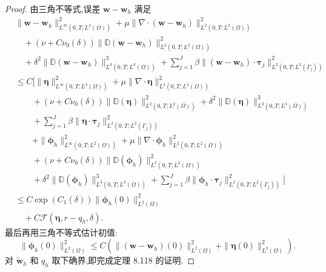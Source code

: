 \begin{theorem}[自然正则性下的一致有限元误差估计]
\begin{proof}
由三角不等式,误差 $\bm{w}-\bm{w}_h$ 满足
\[
\begin{aligned}
&\|\bm{w}-\bm{w}_h\|_{L^\infty(0,T;L^2(\Omega))}^2
 +\mu\|\nabla\cdot(\bm{w}-\bm{w}_h)\|_{L^2(0,T;L^2(\Omega))}^2\\
&\quad+(\nu+C\nu_0(\delta))
       \|\mathbb{D}(\bm{w}-\bm{w}_h)\|_{L^2(0,T;L^2(\Omega))}^2\\
&\quad+\delta^2\|\mathbb{D}(\bm{w}-\bm{w}_h)\|_{L^3(0,T;L^3(\Omega))}^3
 +\sum_{j=1}^J\beta
       \|(\bm{w}-\bm{w}_h)\cdot\symbf{\tau}_j\|
         _{L^2(0,T;L^2(\Gamma_j))}^2\\
&\le C\Biggl[\|\symbf{\eta}\|_{L^\infty(0,T;L^2(\Omega))}^2
 +\mu\|\nabla\cdot\symbf{\eta}\|_{L^2(0,T;L^2(\Omega))}^2\\
&\qquad+(\nu+C\nu_0(\delta))
       \|\mathbb{D}(\symbf{\eta})\|_{L^2(0,T;L^2(\Omega))}^2
 +\delta^2\|\mathbb{D}(\symbf{\eta})\|_{L^3(0,T;L^3(\Omega))}^3\\
&\qquad+\sum_{j=1}^J\beta
       \|\symbf{\eta}\cdot\symbf{\tau}_j\|_{L^2(0,T;L^2(\Gamma_j))}^2\\
&\qquad+\|\symbf{\phi}_h\|_{L^\infty(0,T;L^2(\Omega))}^2
 +\mu\|\nabla\cdot\symbf{\phi}_h\|_{L^2(0,T;L^2(\Omega))}^2\\
&\qquad+(\nu+C\nu_0(\delta))
       \|\mathbb{D}(\symbf{\phi}_h)\|_{L^2(0,T;L^2(\Omega))}^2\\
&\qquad+\delta^2\|\mathbb{D}(\symbf{\phi}_h)\|_{L^3(0,T;L^3(\Omega))}^3
 +\sum_{j=1}^J\beta
       \|\symbf{\phi}_h\cdot\symbf{\tau}_j\|_{L^2(0,T;L^2(\Gamma_j))}^2\Biggr]\\
&\le C\exp(C_1(\delta))
       \|\symbf{\phi}_h(0)\|_{L^2(\Omega)}^2\\
&\quad+C\mathcal{F}(\symbf{\eta},r-q_h,\delta).
\end{aligned}
\]
最后再用三角不等式估计初值:
\[
\|\symbf{\phi}_h(0)\|_{L^2(\Omega)}^2
\le C\left(
       \|(\bm{w}-\bm{w}_h)(0)\|_{L^2(\Omega)}^2
      +\|\symbf{\eta}(0)\|_{L^2(\Omega)}^2\right).
\]
对 $\widetilde{\bm{w}}_h$ 和 $q_h$ 取下确界,即完成定理 8.118 的证明.
\end{proof}
\end{theorem}

